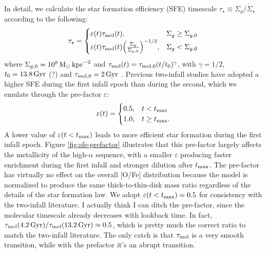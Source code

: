 \documentclass[twocolumn,twocolappendix,linenumbers]{aastex631}
\newcommand{\todo}[1]{{\color{red}#1}}
\begin{document}
In detail, we calculate the star formation efficiency (SFE) timescale $\tau_\star\equiv\Sigma_g/\dot\Sigma_\star$ according to the following:
\begin{equation}
    \label{eq:sf-law}
    \tau_\star = 
    \begin{cases}
        \varepsilon(t) \tau_{\rm mol}(t),   & \Sigma_g \ge \Sigma_{g,0} \\
        \varepsilon(t) \tau_{\rm mol}(t) \Big(\frac{\Sigma_g}{\Sigma_{g,0}}\Big)^{-1/2}, & \Sigma_g < \Sigma_{g,0}
    \end{cases}
\end{equation}
where $\Sigma_{g,0} = 10^8\,{\rm M}_\odot\,{\rm kpc}^{-2}$ and $\tau_{\rm mol}(t)=\tau_{\rm mol,0}(t/t_0)^\gamma$, with $\gamma=1/2$, $t_0=13.8\,{\rm Gyr}$ \todo{(?)} and $\tau_{\rm mol,0}=2\,{\rm Gyr}$ \citet{leroy_star_2008}. Previous two-infall studies \citep[e.g.,][]{nissen_high-precision_2020} have adopted a higher SFE during the first infall epoch than during the second, which we emulate through the pre-factor $\varepsilon$:
\begin{equation}
    \label{eq:sfe-prefactor}
    \varepsilon(t) = 
    \begin{cases}
        0.5, & t < t_{\rm max} \\
        1.0, & t \ge t_{\rm max}.
    \end{cases}
\end{equation}
A lower value of $\varepsilon(t<t_{\rm max})$ leads to more efficient star formation during the first infall epoch. Figure \ref{fig:sfe-prefactor} illustrates that this pre-factor largely affects the metallicity of the high-$\alpha$ sequence, with a smaller $\varepsilon$ producing faster enrichment during the first infall and stronger dilution after $t_{\rm max}$. The pre-factor has virtually no effect on the overall [O/Fe] distribution because the model is normalized to produce the same thick-to-thin-disk mass ratio regardless of the details of the star formation law. We adopt $\varepsilon(t<t_{\rm max})=0.5$ for consistency with the two-infall literature. \todo{I actually think I can ditch the pre-factor, since the molecular timescale already decreases with lookback time. In fact, $\tau_{\rm mol}(4.2\,{\rm Gyr}) / \tau_{\rm mol}(13.2\,{\rm Gyr}) \approx 0.5$, which is pretty much the correct ratio to match the two-infall literature. The only catch is that $\tau_{\rm mol}$ is a very smooth transition, while with the prefactor it's an abrupt transition.}
\end{document}
